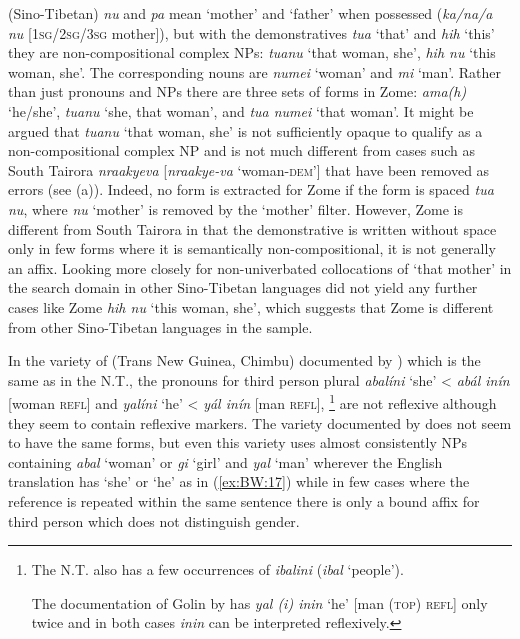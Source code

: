 \documentclass[output=collectionpaper]{langsci/langscibook}
\begin{document}
 (Sino-Tibetan) \textit{nu} and \textit{pa} mean ‘mother’ and ‘father’ when possessed (\textit{ka/na/a nu} [\textsc{1sg/2sg/3sg} mother]), but with the demonstratives \textit{tua} ‘that’ and \textit{hih} ‘this’ they are non-compositional complex NPs: \textit{tuanu} ‘that woman, she’, \textit{hih nu} ‘this woman, she’. The corresponding nouns are \textit{numei} ‘woman’ and \textit{mi} ‘man’. Rather than just pronouns and NPs there are three sets of forms in Zome: \textit{ama(h)} ‘he/she’, \textit{tuanu} ‘she, that woman’, and \textit{tua numei} ‘that woman’. It might be argued that \textit{tuanu} ‘that woman, she’ is not sufficiently opaque to qualify as a non-compositional complex NP and is not much different from cases such as South Tairora \textit{nraakyeva} [\textit{nraakye-va} ‘woman-\textsc{dem}'] that have been removed as errors (see (a)). Indeed, no form is extracted for Zome if the form is spaced \textit{tua nu}, where \textit{nu} ‘mother’ is removed by the ‘mother’ filter. However, Zome is different from South Tairora in that the demonstrative is written without space only in few forms where it is semantically non-compositional, it is not generally an affix. Looking more closely for non-univerbated collocations of ‘that mother’ in the search domain in other Sino-Tibetan languages did not yield any further cases like Zome \textit{hih nu} ‘this woman, she’, which suggests that Zome is different from other Sino-Tibetan languages in the sample.

In the variety of  (Trans New Guinea, Chimbu) documented by \citet[55]{Bunn1974}) which is the same as in the N.T., the pronouns for third person plural \textit{abalíni} ‘she’ < \textit{abál inín} [woman \textsc{refl}] and \textit{yalíni} ‘he’ < \textit{yál inín} [man \textsc{refl}],%
\footnote{%
The N.T. also has a few occurrences of \textit{ibalini} (\textit{ibal} ‘people’).

The documentation of Golin by \citet{Evans2005} has \textit{yal (i) inin} ‘he’ [man \textsc{(top) refl}] only twice and in both cases \textit{inin} can be interpreted reflexively.
} %
are not reflexive although they seem to contain reflexive markers. The variety documented by \citet{Evans2005} does not seem to have the same forms, but even this variety uses almost consistently NPs containing \textit{abal} ‘woman’ or \textit{gi} ‘girl’ and \textit{yal} ‘man’ wherever the English translation has ‘she’ or ‘he’ as in (\ref{ex:BW:17}) while in few cases where the reference is repeated within the same sentence there is only a bound affix for third person which does not distinguish gender.
\end{document}
